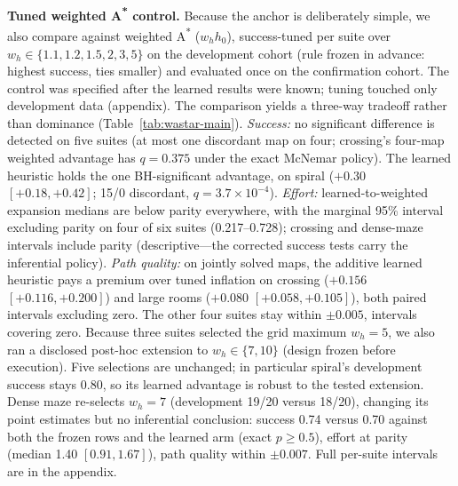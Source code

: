 \documentclass[letterpaper]{article} %
\begin{document}
\textbf{Tuned weighted A\textsuperscript{*} control.} Because the anchor is deliberately simple, we also compare against weighted A\textsuperscript{*} ($w_h h_0$), success-tuned per suite over $w_h \in \{1.1, 1.2, 1.5, 2, 3, 5\}$ on the development cohort (rule frozen in advance: highest success, ties smaller) and evaluated once on the confirmation cohort. The control was specified after the learned results were known; tuning touched only development data (appendix). The comparison yields a three-way tradeoff rather than dominance (Table~\ref{tab:wastar-main}). \emph{Success:} no significant difference is detected on five suites (at most one discordant map on four; crossing's four-map weighted advantage has $q{=}0.375$ under the exact McNemar policy). The learned heuristic holds the one BH-significant advantage, on spiral ($+0.30$ $[+0.18,+0.42]$; 15/0 discordant, $q{=}3.7\times10^{-4}$). \emph{Effort:} learned-to-weighted expansion medians are below parity everywhere, with the marginal 95\% interval excluding parity on four of six suites (0.217--0.728); crossing and dense-maze intervals include parity (descriptive---the corrected success tests carry the inferential policy). \emph{Path quality:} on jointly solved maps, the additive learned heuristic pays a premium over tuned inflation on crossing ($+0.156$ $[+0.116,+0.200]$) and large rooms ($+0.080$ $[+0.058,+0.105]$), both paired intervals excluding zero. The other four suites stay within $\pm 0.005$, intervals covering zero. Because three suites selected the grid maximum $w_h{=}5$, we also ran a disclosed post-hoc extension to $w_h \in \{7, 10\}$ (design frozen before execution). Five selections are unchanged; in particular spiral's development success stays 0.80, so its learned advantage is robust to the tested extension. Dense maze re-selects $w_h{=}7$ (development 19/20 versus 18/20), changing its point estimates but no inferential conclusion: success 0.74 versus 0.70 against both the frozen rows and the learned arm (exact $p \geq 0.5$), effort at parity (median 1.40 $[0.91, 1.67]$), path quality within $\pm 0.007$. Full per-suite intervals are in the appendix.
\end{document}
